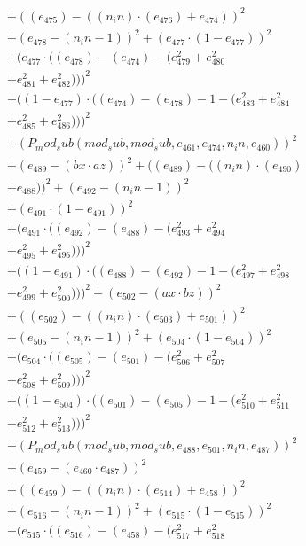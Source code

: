 \documentclass[10pt, a4paper]{article}
\begin{document}
\begin{small}
\begin{align*}
& + ((e_{475}) - ((n_in)  \cdot  (e_{476}) + e_{474}))^{2} \\
& + (e_{478} - (n_in - 1))^{2} + (e_{477}  \cdot  (1 - e_{477}))^{2} \\
& + (e_{477}  \cdot  ((e_{478}) - (e_{474}) - (e_{479}^{2} + e_{480}^{2} \\
& + e_{481}^{2} + e_{482}^{2})))^{2} \\
& + ((1 - e_{477})  \cdot  ((e_{474}) - (e_{478}) - 1 - (e_{483}^{2} + e_{484}^{2} \\
& + e_{485}^{2} + e_{486}^{2})))^{2} \\
& + (P_mod_sub(mod_sub, mod_sub, e_{461}, e_{474}, n_in, e_{460}))^{2} \\
& + (e_{489} - (bx  \cdot  az))^{2} + ((e_{489}) - ((n_in)  \cdot  (e_{490}) \\
& + e_{488}))^{2} + (e_{492} - (n_in - 1))^{2} \\
& + (e_{491}  \cdot  (1 - e_{491}))^{2} \\
& + (e_{491}  \cdot  ((e_{492}) - (e_{488}) - (e_{493}^{2} + e_{494}^{2} \\
& + e_{495}^{2} + e_{496}^{2})))^{2} \\
& + ((1 - e_{491})  \cdot  ((e_{488}) - (e_{492}) - 1 - (e_{497}^{2} + e_{498}^{2} \\
& + e_{499}^{2} + e_{500}^{2})))^{2} + (e_{502} - (ax  \cdot  bz))^{2} \\
& + ((e_{502}) - ((n_in)  \cdot  (e_{503}) + e_{501}))^{2} \\
& + (e_{505} - (n_in - 1))^{2} + (e_{504}  \cdot  (1 - e_{504}))^{2} \\
& + (e_{504}  \cdot  ((e_{505}) - (e_{501}) - (e_{506}^{2} + e_{507}^{2} \\
& + e_{508}^{2} + e_{509}^{2})))^{2} \\
& + ((1 - e_{504})  \cdot  ((e_{501}) - (e_{505}) - 1 - (e_{510}^{2} + e_{511}^{2} \\
& + e_{512}^{2} + e_{513}^{2})))^{2} \\
& + (P_mod_sub(mod_sub, mod_sub, e_{488}, e_{501}, n_in, e_{487}))^{2} \\
& + (e_{459} - (e_{460}  \cdot  e_{487}))^{2} \\
& + ((e_{459}) - ((n_in)  \cdot  (e_{514}) + e_{458}))^{2} \\
& + (e_{516} - (n_in - 1))^{2} + (e_{515}  \cdot  (1 - e_{515}))^{2} \\
& + (e_{515}  \cdot  ((e_{516}) - (e_{458}) - (e_{517}^{2} + e_{518}^{2} \\

\end{align*}
\end{small}
\end{document}
